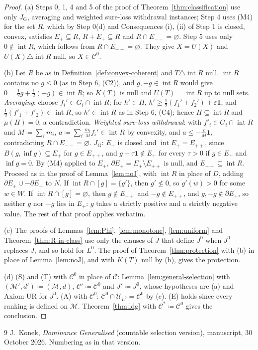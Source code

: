 \documentclass[11pt]{article}
\theoremstyle{definition}
\newcommand{\M}{\mathcal M}
\newcommand{\C}{\mathcal C}
\newcommand{\U}{\mathcal U}
\newcommand{\one}{\mathbf 1}
\newcommand{\interior}{\operatorname{int}}
\newcommand{\bd}{\partial}
\newcommand{\GU}{\mathrm{G}}
\begin{document}
\begin{proof}
(a) Steps 0, 1, 4 and 5 of the proof of Theorem~\ref{thm:classification} use only $J_\GU$, averaging and weighted sure-loss withdrawal instances; Step 4 uses (M4) for the set $R$, which by Step 0(d) and Consequences (i), (ii) of Step 1 is closed, convex, satisfies $E_+\subseteq R$, $R+E_+\subseteq R$ and $R\cap E_{--}=\varnothing$. Step 5 uses only $0\notin\interior R$, which follows from $R\cap E_{--}=\varnothing$. They give $X=U(X)$ and $U(X)\triangle\interior R$ null, so $X\in\C^0$.

(b) Let $R$ be as in Definition~\ref{def:convex-coherent} and $T\triangle\interior R$ null. $\interior R$ contains no $g\le0$ (as in Step 6, (C2)), and $g,-g\in\interior R$ would give $0=\frac12g+\frac12(-g)\in\interior R$; so $K(T)$ is null and $U(T)=\interior R$ up to null sets. \emph{Averaging}: choose $f_i'\in G_i\cap\interior R$; for $h'\in H$, $h'\ge\frac12(f_1'+f_2')+\varepsilon\one$, and $\frac12(f'_1+f'_2)\in\interior R$, so $h'\in\interior R$ as in Step 6, (C4); hence $H\subseteq\interior R$ and $\mu(H)=0$, a contradiction. \emph{Weighted sure-loss withdrawal}: with $f'_i\in G_i\cap\interior R$ and $M\coloneqq\sum_im_i$, $a\coloneqq\sum_i\frac{m_i}{M}f_i'\in\interior R$ by convexity, and $a\le-\frac{\varepsilon}{M}\one$, contradicting $R\cap E_{--}=\varnothing$. \emph{$J_\GU$}: $E_+$ is closed and $\interior E_+=E_{++}$, since $B(g,\inf g)\subseteq E_+$ for $g\in E_{++}$, and $g-\tau\one\notin E_+$ for every $\tau>0$ if $g\in E_+$ and $\inf g=0$. By (M4) applied to $E_+$, $\bd E_+=E_+\setminus E_{++}$ is null, and $E_{++}\subseteq\interior R$. Proceed as in the proof of Lemma~\ref{lem:noJ}, with $\interior R$ in place of $D$, adding $\bd E_+\cup-\bd E_+$ to $N$. If $\interior R\cap[g]=\{g'\}$, then $g'\not\le0$, so $g'(w)>0$ for some $w\in W$. If $\interior R\cap[g]=\varnothing$, then $g\notin E_{++}$ and $-g\notin E_{++}$, and $g,-g\notin\bd E_+$, so neither $g$ nor $-g$ lies in $E_+$: $g$ takes a strictly positive and a strictly negative value. The rest of that proof applies verbatim.

(c) The proofs of Lemmas~\ref{lem:Phi}, \ref{lem:monotone}, \ref{lem:uniform} and Theorem~\ref{thm:R-in-class} use only the clauses of $J$ that define $J^0$ when $J^0$ replaces $J$, and so hold for $L^0$. The proof of Theorem~\ref{thm:protection} with (b) in place of Lemma~\ref{lem:noJ}, and with $K(T)$ null by (b), gives the protection.

(d) (S) and (T) with $\C^0$ in place of $\C$: Lemma~\ref{lem:general-selection} with $(\M',d')\coloneqq(\M,d)$, $\C'\coloneqq\C^0$ and $J'\coloneqq J^0$, whose hypotheses are (a) and Axiom UR for $J^0$. (A) with $\C^0$: $\C^0\cap\U_{L^0}=\C^0$ by (c). (E) holds since every ranking is defined on $\M$. Theorem~\ref{thm:ldg} with $\C^\ast\coloneqq\C^0$ gives the conclusion.
\end{proof}

\begin{thebibliography}{9}
 J.~Konek, \emph{Dominance Generalised} (countable selection version), manuscript, 30 October 2026. Numbering as in that version.
\end{thebibliography}
\end{document}
